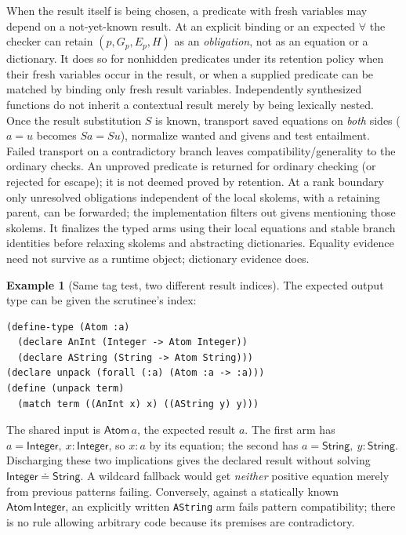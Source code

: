 \documentclass[11pt]{article}
\theoremstyle{definition}
\newtheorem{example}[theorem]{Example}
\newcommand{\code}[1]{\texttt{#1}}
\newcommand{\Int}{\mathsf{Integer}}
\newcommand{\Str}{\mathsf{String}}
\newcommand{\eqs}{\doteq}
\begin{document}
When the result itself is being chosen, a predicate with fresh variables
may depend on a not-yet-known result. At an explicit binding or an expected
$\forall$ the checker can retain $(p,G_p,E_p,H)$ as an \emph{obligation},
not as an equation or a dictionary. It does so for nonhidden predicates
under its retention policy when their fresh variables occur in the result,
or when a supplied predicate can be matched by binding only fresh result
variables. Independently synthesized functions do not inherit a contextual
result merely by being lexically nested. Once the result substitution $S$
is known, transport saved equations on \emph{both} sides
($a=u$ becomes $Sa=Su$), normalize wanted and givens and test entailment.
Failed transport on a contradictory branch leaves compatibility/generality
to the ordinary checks. An unproved predicate is returned for ordinary
checking (or rejected for escape); it is not deemed proved by retention.
At a rank boundary only unresolved obligations independent of the local
skolems, with a retaining parent, can be forwarded; the implementation
filters out givens mentioning those skolems. It finalizes the typed arms
using their local equations and stable branch identities before relaxing
skolems and abstracting dictionaries. Equality evidence need not survive
as a runtime object; dictionary evidence does.

\begin{example}[Same tag test, two different result indices]
The expected output type can be given the scrutinee's index:
\begin{verbatim}
(define-type (Atom :a)
  (declare AnInt (Integer -> Atom Integer))
  (declare AString (String -> Atom String)))
(declare unpack (forall (:a) (Atom :a -> :a)))
(define (unpack term)
  (match term ((AnInt x) x) ((AString y) y)))
\end{verbatim}
The shared input is $\mathsf{Atom}\,a$, the expected result $a$. The
first arm has $a=\Int,\ x:\Int$, so $x:a$ by its equation; the second
has $a=\Str,\ y:\Str$. Discharging these two implications gives the
declared result without solving $\Int\eqs\Str$. A wildcard fallback would
get \emph{neither} positive equation merely from previous patterns failing.
Conversely, against a statically known $\mathsf{Atom}\,\Int$, an explicitly
written \code{AString} arm fails pattern compatibility; there is no rule
allowing arbitrary code because its premises are contradictory.
\end{example}
\end{document}
